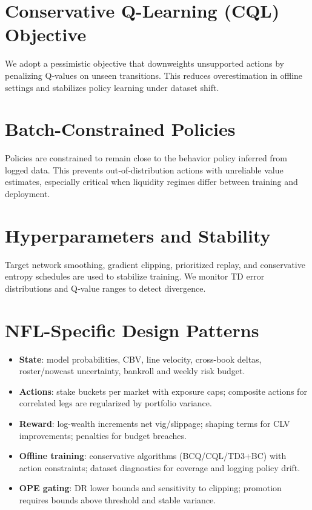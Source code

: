 \section{Conservative Q-Learning (CQL) Objective}
We adopt a pessimistic objective that downweights unsupported actions by penalizing Q‑values on unseen transitions. This reduces overestimation in offline settings and stabilizes policy learning under dataset shift.

\section{Batch-Constrained Policies}
Policies are constrained to remain close to the behavior policy inferred from logged data. This prevents out‑of‑distribution actions with unreliable value estimates, especially critical when liquidity regimes differ between training and deployment.

\section{Hyperparameters and Stability}
Target network smoothing, gradient clipping, prioritized replay, and conservative entropy schedules are used to stabilize training. We monitor TD error distributions and Q‑value ranges to detect divergence.

\section{NFL-Specific Design Patterns}
\begin{itemize}
  \item \textbf{State}: model probabilities, CBV, line velocity, cross-book deltas, roster/nowcast uncertainty, bankroll and weekly risk budget.
  \item \textbf{Actions}: stake buckets per market with exposure caps; composite actions for correlated legs are regularized by portfolio variance.
  \item \textbf{Reward}: log-wealth increments net vig/slippage; shaping terms for CLV improvements; penalties for budget breaches.
  \item \textbf{Offline training}: conservative algorithms (BCQ/CQL/TD3+BC) with action constraints; dataset diagnostics for coverage and logging policy drift.
  \item \textbf{OPE gating}: DR lower bounds and sensitivity to clipping; promotion requires bounds above threshold and stable variance.
\end{itemize}

